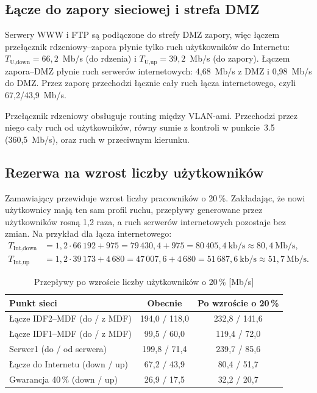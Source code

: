 \documentclass[12pt,a4paper]{article}
\begin{document}
\subsection{Łącze do zapory sieciowej i strefa DMZ}

Serwery WWW i FTP są podłączone do strefy DMZ zapory, więc łączem przełącznik
rdzeniowy--zapora płynie tylko ruch użytkowników do Internetu:
$T_\text{U,down} = 66{,}2$~Mb/s (do rdzenia) i $T_\text{U,up} = 39{,}2$~Mb/s
(do zapory). Łączem zapora--DMZ płynie ruch serwerów internetowych:
4{,}68~Mb/s z DMZ i 0{,}98~Mb/s do DMZ. Przez zaporę przechodzi łącznie cały
ruch łącza internetowego, czyli 67{,}2/43{,}9~Mb/s.

Przełącznik rdzeniowy obsługuje routing między VLAN-ami. Przechodzi przez
niego cały ruch od użytkowników, równy sumie z kontroli w punkcie~3.5
(360{,}5~Mb/s), oraz ruch w przeciwnym kierunku.

\subsection{Rezerwa na wzrost liczby użytkowników}

Zamawiający przewiduje wzrost liczby pracowników o 20\,\%. Zakładając, że nowi
użytkownicy mają ten sam profil ruchu, przepływy generowane przez użytkowników
rosną 1,2 raza, a ruch serwerów internetowych pozostaje bez zmian.
Na przykład dla łącza internetowego:
\begin{align*}
T_\text{Int,down} &= 1{,}2\cdot66\,192 + 975 = 79\,430{,}4 + 975 = 80\,405{,}4~\text{kb/s} \approx 80{,}4~\text{Mb/s},\\
T_\text{Int,up}   &= 1{,}2\cdot39\,173 + 4\,680 = 47\,007{,}6 + 4\,680 = 51\,687{,}6~\text{kb/s} \approx 51{,}7~\text{Mb/s}.
\end{align*}

\begin{table}[htbp]
\centering
\caption{Przepływy po wzroście liczby użytkowników o 20\,\% [Mb/s]}
\label{tab:wzrost}
\begin{tabular}{lcc}
\toprule
Punkt sieci & Obecnie & Po wzroście o 20\,\% \\
\midrule
Łącze IDF2--MDF (do / z MDF)     & 194{,}0 / 118{,}0 & 232{,}8 / 141{,}6 \\
Łącze IDF1--MDF (do / z MDF)     & 99{,}5 / 60{,}0   & 119{,}4 / 72{,}0 \\
Serwer1 (do / od serwera)        & 199{,}8 / 71{,}4  & 239{,}7 / 85{,}6 \\
Łącze do Internetu (down / up)   & 67{,}2 / 43{,}9   & 80{,}4 / 51{,}7 \\
Gwarancja 40\,\% (down / up)     & 26{,}9 / 17{,}5   & 32{,}2 / 20{,}7 \\
\bottomrule
\end{tabular}
\end{table}
\end{document}
